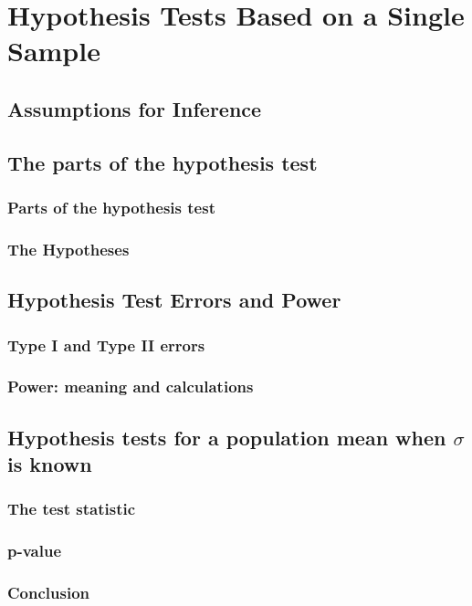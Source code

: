 \chapter{Hypothesis Tests Based on a Single Sample}  %

\section{Assumptions for Inference}  %

\section{The parts of the hypothesis test}  %
    \subsection{Parts of the hypothesis test}  %
    \subsection{The Hypotheses}  %

\section{Hypothesis Test Errors and Power}  %
    \subsection{Type I and Type II errors}  %
    \subsection{Power: meaning and calculations}  %

\section{Hypothesis tests for a population mean when $\sigma$ is known}  %
    \subsection{The test statistic}  %
    \subsection{p-value}  %
    \subsection{Conclusion}  %
